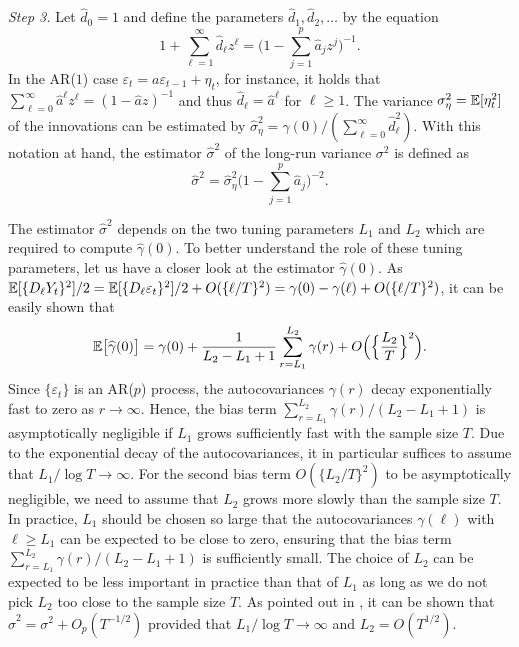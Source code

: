 \textit{Step 3.} Let $\widehat{d}_0 = 1$ and define the parameters $\widehat{d}_1, \widehat{d}_2, \ldots$ by the equation  
\[ 1 + \sum_{\ell=1}^\infty \widehat{d}_\ell z^\ell = \Big(1 - \sum_{j=1}^p \widehat{a}_j z^j \Big)^{-1}. \]
In the AR($1$) case $\varepsilon_t = a \varepsilon_{t-1} + \eta_t$, for instance, it holds that $\sum_{\ell = 0}^\infty \widehat{a}^\ell z^\ell = (1 - \widehat{a}z)^{-1}$ and thus $\widehat{d}_\ell = \widehat{a}^\ell$ for $\ell \ge 1$. The variance $\sigma_\eta^2 = \mathbb{E}[\eta_t^2]$ of the innovations can be estimated by $\widehat{\sigma}_\eta^2 = \widehat{\gamma}(0) / (\sum_{\ell=0}^\infty \widehat{d}_\ell^2)$. With this notation at hand, the estimator $\widehat{\sigma}^2$ of the long-run variance $\sigma^2$ is defined as 
\[\widehat{\sigma}^2 = \widehat{\sigma}^2_\eta \Big( 1-\sum_{j=1}^p \widehat{a}_j\Big)^{-2}.\]
\vspace{3pt}


The estimator $\widehat{\sigma}^2$ depends on the two tuning parameters $L_1$ and $L_2$ which are required to compute $\widehat{\gamma}(0)$. To better understand the role of these tuning parameters, let us have a closer look at the estimator $\widehat{\gamma}(0)$. As $\mathbb{E}[ \{ D_\ell Y_t \}^2 ]/2 = \mathbb{E}[ \{ D_\ell \varepsilon_t \}^2 ]/2 + O( \{\ell/T\}^2 ) = \gamma(0) - \gamma(\ell) + O( \{\ell/T\}^2 )$, it can be easily shown that
\[ \mathbb{E}\big[\widehat{\gamma}(0)\big] = \gamma(0) + \frac{1}{L_2-L_1+1}\sum_{r=L_1}^{L_2} \gamma(r) + O\Big( \Big\{\frac{L_2}{T} \Big\}^2 \Big). \]
Since $\{ \varepsilon_t\}$ is an AR($p$) process, the autocovariances $\gamma(r)$ decay exponentially fast to zero as $r \rightarrow \infty$. Hence, the bias term $\sum_{r=L_1}^{L_2} \gamma(r) / (L_2-L_1+1)$ is asymptotically negligible if $L_1$ grows sufficiently fast with the sample size $T$. Due to the exponential decay of the autocovariances, it in particular suffices to assume that $L_1/\log T \rightarrow \infty$. For the second bias term  $O(\{ L_2/T \}^2)$ to be asymptotically negligible, we need to assume that $L_2$ grows more slowly than the sample size $T$. In practice, $L_1$ should be chosen so large that the autocovariances $\gamma(\ell)$ with $\ell \ge L_1$ can be expected to be close to zero, ensuring that the bias term $\sum_{r=L_1}^{L_2} \gamma(r) / (L_2-L_1+1)$ is sufficiently small. The choice of $L_2$ can be expected to be less important in practice than that of $L_1$ as long as we do not pick $L_2$ too close to the sample size $T$. As pointed out in \cite{Hall2003}, it can be shown that $\widehat{\sigma}^2 = \sigma^2 + O_p(T^{-1/2})$ provided that $L_1/\log T \rightarrow \infty$ and $L_2 = O(T^{1/2})$. 


